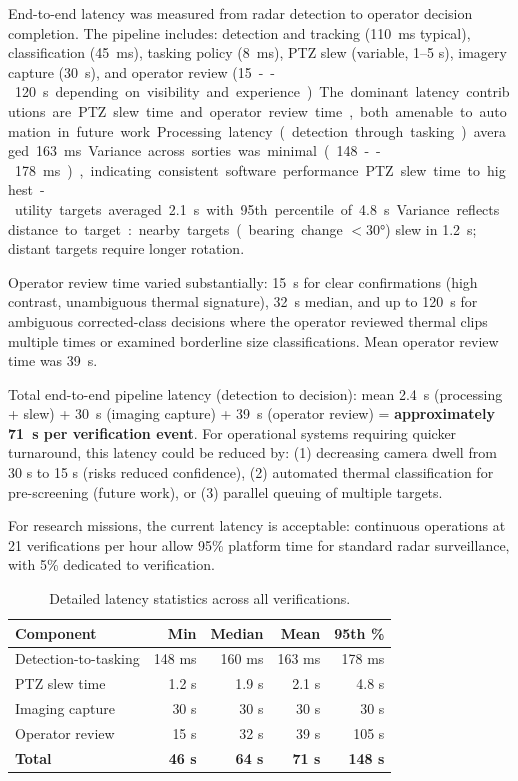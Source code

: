 \documentclass[conf]{asmeconf}
\begin{document}
End-to-end latency was measured from radar detection to operator decision completion. The pipeline includes: detection and tracking (\SI{110}{ms} typical), classification (\SI{45}{ms}), tasking policy (\SI{8}{ms}), PTZ slew (variable, 1--5 s), imagery capture (\SI{30}{s}), and operator review (\SI{15}--\SI{120}{s} depending on visibility and experience). The dominant latency contributions are PTZ slew time and operator review time, both amenable to automation in future work.

Processing latency (detection through tasking) averaged \SI{163}{ms}. Variance across sorties was minimal (\SI{148}--\SI{178}{ms}), indicating consistent software performance.

PTZ slew time to highest-utility targets averaged \SI{2.1}{s} with 95th percentile of \SI{4.8}{s}. Variance reflects distance to target: nearby targets (bearing change $<30°$) slew in \SI{1.2}{s}; distant targets require longer rotation.

Operator review time varied substantially: \SI{15}{s} for clear confirmations (high contrast, unambiguous thermal signature), \SI{32}{s} median, and up to \SI{120}{s} for ambiguous corrected-class decisions where the operator reviewed thermal clips multiple times or examined borderline size classifications. Mean operator review time was \SI{39}{s}.

Total end-to-end pipeline latency (detection to decision): mean \SI{2.4}{s} (processing + slew) + \SI{30}{s} (imaging capture) + \SI{39}{s} (operator review) = \textbf{approximately \SI{71}{s} per verification event}. For operational systems requiring quicker turnaround, this latency could be reduced by: (1) decreasing camera dwell from 30 s to 15 s (risks reduced confidence), (2) automated thermal classification for pre-screening (future work), or (3) parallel queuing of multiple targets.

For research missions, the current latency is acceptable: continuous operations at 21 verifications per hour allow 95\% platform time for standard radar surveillance, with 5\% dedicated to verification.

\begin{table}[t]
\caption{Detailed latency statistics across all verifications.}
\label{tab:latency_detail}
\centering
\begin{tabular}{@{}lrrrr@{}}
\toprule
Component & Min & Median & Mean & 95th \% \\
\midrule
Detection-to-tasking & 148 ms & 160 ms & 163 ms & 178 ms \\
PTZ slew time & 1.2 s & 1.9 s & 2.1 s & 4.8 s \\
Imaging capture & 30 s & 30 s & 30 s & 30 s \\
Operator review & 15 s & 32 s & 39 s & 105 s \\
\midrule
\textbf{Total} & \textbf{46 s} & \textbf{64 s} & \textbf{71 s} & \textbf{148 s} \\
\end{tabular}
\end{table}
\end{document}
